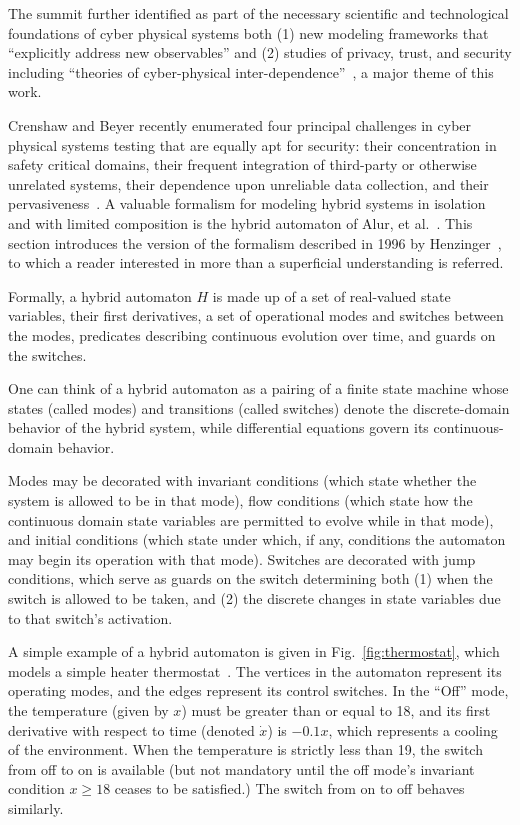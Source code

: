 The summit further identified as part of the necessary scientific and technological foundations of
cyber physical systems both (1) new modeling frameworks that ``explicitly address new observables'' and (2)
studies of privacy, trust, and security including ``theories of cyber-physical inter-dependence''~\cite{summitreport2008},
a major theme of this work.

Crenshaw and Beyer recently enumerated four principal challenges in cyber physical systems testing that are
equally apt for security:
their concentration in safety critical domains, their frequent integration of third-party or
otherwise unrelated systems, their dependence upon unreliable data collection, and their
pervasiveness~\cite{crenshaw2010upbot}.
A valuable formalism for modeling hybrid systems in isolation and with limited composition
is the hybrid automaton of Alur, et al.~\cite{alur1993hybrid}. This section introduces the
version of the formalism described in 1996 by Henzinger~\cite{henzinger1996theory}, to which a
reader interested in more than a superficial understanding is referred. 

Formally,
a hybrid automaton $H$ is made up of a set of real-valued state variables, 
their first derivatives, a set of operational modes and switches between the 
modes, predicates describing continuous evolution over time, and guards on the
switches.

One can think of a hybrid automaton as a pairing of a finite state machine 
whose states (called modes) and transitions (called switches) denote the 
discrete-domain behavior of the hybrid system, while differential equations 
govern its continuous-domain behavior.

Modes may be decorated with invariant conditions (which state whether the 
system is allowed to be in that mode), flow conditions (which state how the 
continuous domain state variables are permitted to evolve while in that
mode), and initial conditions (which state under which, if any, conditions the 
automaton may begin its operation with that mode). Switches are decorated with 
jump conditions, which serve as guards on the switch determining
both (1) when the switch is allowed to be taken, and (2) the discrete changes 
in state variables due to that
switch's activation.

A simple example of a hybrid automaton is given in Fig.~\ref{fig:thermostat}, 
which models a simple
heater thermostat~\cite{henzinger1996theory}. The vertices in the automaton represent 
its operating modes, and the edges represent its control
switches. In the ``Off'' mode, the temperature (given by $x$) must be greater 
than or equal to 18, and
its first derivative with respect to time (denoted $\dot{x}$) is $-0.1x$, which 
represents a cooling of
the environment. When the temperature is strictly less than 19, the switch from
off to on is available (but
not mandatory until the off mode's invariant condition $x \geq 18$ ceases to 
be satisfied.) The switch from on to off behaves similarly.

